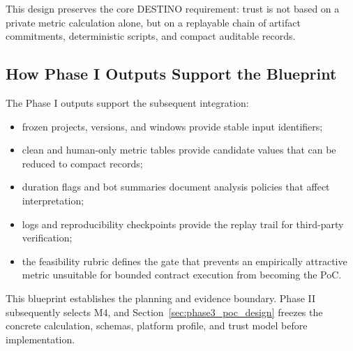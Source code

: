 This design preserves the core DESTINO requirement: trust is not based on a private metric calculation alone, but on a replayable
chain of artifact commitments, deterministic scripts, and compact auditable records.

\subsection{How Phase I Outputs Support the Blueprint}
\label{sec:design_to_phase1}

The Phase I outputs support the subsequent integration:
\begin{itemize}[leftmargin=*]
  \item frozen projects, versions, and windows provide stable input identifiers;
  \item clean and human-only metric tables provide candidate values that can be reduced to compact records;
  \item duration flags and bot summaries document analysis policies that affect interpretation;
  \item logs and reproducibility checkpoints provide the replay trail for third-party verification;
  \item the feasibility rubric defines the gate that prevents an empirically attractive metric unsuitable for bounded contract execution from becoming the PoC.
\end{itemize}

This blueprint establishes the planning and evidence boundary. Phase II subsequently selects M4, and
Section~\ref{sec:phase3_poc_design} freezes the concrete calculation, schemas, platform profile, and trust model before implementation.
